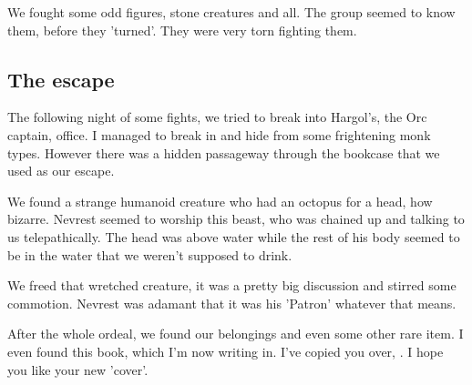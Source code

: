 We fought some odd figures, stone creatures and all. The group seemed to know them, before they 'turned'. They were very torn fighting them.

\subsection*{The escape}

The following night of some fights, we tried to break into Hargol's, the Orc captain, office. I managed to break in and hide from some frightening monk types. However there was a hidden passageway through the bookcase that we used as our escape.

We found a strange humanoid creature who had an octopus for a head, how bizarre. Nevrest seemed to worship this beast, who was chained up and talking to us telepathically. The head was above water while the rest of his body seemed to be in the water that we weren't supposed to drink.

We freed that wretched creature, it was a pretty big discussion and stirred some commotion. Nevrest was adamant that it was his 'Patron' whatever that means.

After the whole ordeal, we found our belongings and even some other rare item. I even found this book, which I'm now writing in. I've copied you over, \Master{}. I hope you like your new 'cover'.